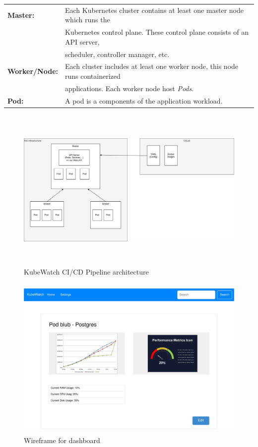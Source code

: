 \begin{tabular}{ll}
  \textbf{Master:}        & Each Kubernetes cluster contains at least one master node which runs the \\ 
                          & Kubernetes control plane. These control plane consists of an API server, \\
                          & scheduler, controller manager, etc. \\
  \textbf{Worker/Node:}   & Each cluster includes at least one worker node, this node runs containerized \\
                          & applications. Each worker node host \textit{Pods}. \\
  \textbf{Pod:}           & A pod is a components of the application workload. \\
\end{tabular}

\begin{figure}[h]
  \centering
  \caption{KubeWatch CI/CD Pipeline architecture}
  \label{fig:architecture}
  \includegraphics[height=8cm]{resources/architecture.png}
\end{figure}

\begin{figure}[h]
  \centering
  \caption{\label{fig:wireframe-dashboard}Wireframe for dashboard}
  \includegraphics[height=8cm]{resources/wireframe_kubewatch-Dashboard.png}
\end{figure}

